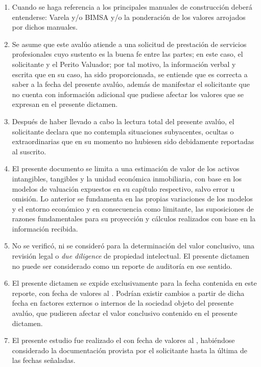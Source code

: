 \begin{enumerate}[\indent a)]
\item Cuando se haga referencia a los principales manuales de construcción deberá entenderse: Varela y/o BIMSA y/o la ponderación de los valores arrojados por dichos manuales.

\item Se asume que este avalúo atiende a una solicitud de prestación de servicios profesionales cuyo sustento es  la buena fe entre las partes; en este caso, el solicitante y el Perito Valuador; por tal motivo, la información verbal y escrita que en su caso, ha sido proporcionada, se entiende que es correcta a saber a la fecha del presente avalúo, además de manifestar el solicitante que no cuenta con información adicional  que pudiese afectar los valores que se expresan en el presente dictamen.

\item Después de haber llevado a cabo la lectura total del presente avalúo, el solicitante declara que no contempla situaciones subyacentes, ocultas o extraordinarias que en su momento no hubiesen sido debidamente reportadas al suscrito.

\item El presente documento se limita a una estimación de valor de los activos intangibles, tangibles y la unidad económica inmobiliaria, con base en los modelos de valuación expuestos en su capítulo respectivo, salvo error u omisión. Lo anterior se fundamenta en las propias variaciones de los modelos y el entorno económico y en consecuencia como limitante, las suposiciones de razones fundamentales para su proyección y cálculos realizados con base en la información recibida.

\item No se verificó, ni se consideró para la determinación del valor conclusivo, una revisión legal o \textit{due diligence} de propiedad intelectual. El presente dictamen no puede ser considerado como un reporte de auditoría en ese sentido. 

\item El presente dictamen se expide exclusivamente para la fecha contenida en este reporte, con fecha de valores  al \textcolor{principal}{\fechaValores}. Podrían existir cambios a partir de dicha fecha en factores externos o internos   de la sociedad objeto del presente avalúo, que pudieren afectar el valor conclusivo contenido en el presente dictamen.

\item El presente estudio fue realizado el \textcolor{principal}{\fechaVisita} con fecha de valores al \textcolor{principal}{\fechaValores}, habiéndose considerado la documentación provista por el solicitante hasta la última de las fechas señaladas.



\end{enumerate}
